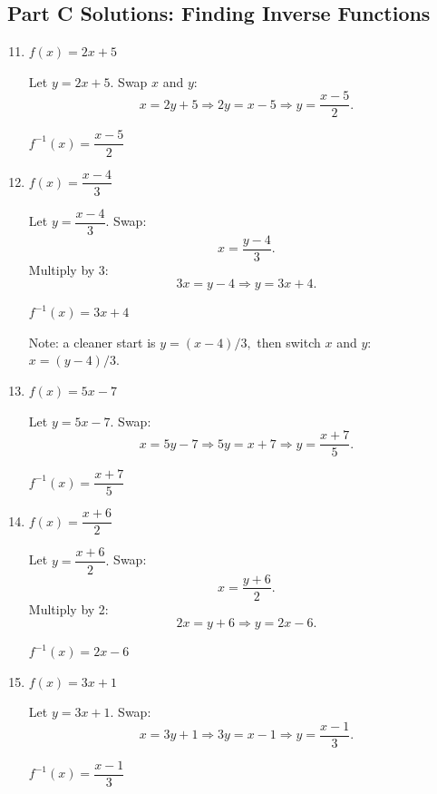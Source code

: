 \documentclass[14pt]{extarticle}
\begin{document}
\subsection*{Part C Solutions: Finding Inverse Functions}
\begin{enumerate}
  \setcounter{enumi}{10}
  \item \(f(x) = 2x + 5\)

  Let \(y = 2x + 5.\) Swap \(x\) and \(y\):
  \[
  x = 2y + 5 \Rightarrow 2y = x - 5 \Rightarrow y = \frac{x - 5}{2}.
  \]

  \(\boxed{f^{-1}(x) = \dfrac{x - 5}{2}}\)

  \item \(f(x) = \dfrac{x - 4}{3}\)

  Let \(y = \dfrac{x - 4}{3}.\) Swap:
  \[
  x = \dfrac{y - 4}{3}.
  \]
  Multiply by 3:
  \[
  3x = y - 4 \Rightarrow y = 3x + 4.
  \]

  \(\boxed{f^{-1}(x) = 3x + 4}\)

  Note: a cleaner start is \(y = (x - 4)/3,\) then switch \(x\) and \(y\): \(x = (y - 4)/3.\)

  \item \(f(x) = 5x - 7\)

  Let \(y = 5x - 7.\) Swap:
  \[
  x = 5y - 7 \Rightarrow 5y = x + 7 \Rightarrow y = \frac{x + 7}{5}.
  \]

  \(\boxed{f^{-1}(x) = \dfrac{x + 7}{5}}\)

  \item \(f(x) = \dfrac{x + 6}{2}\)

  Let \(y = \dfrac{x + 6}{2}.\) Swap:
  \[
  x = \dfrac{y + 6}{2}.
  \]
  Multiply by 2:
  \[
  2x = y + 6 \Rightarrow y = 2x - 6.
  \]

  \(\boxed{f^{-1}(x) = 2x - 6}\)

  \item \(f(x) = 3x + 1\)

  Let \(y = 3x + 1.\) Swap:
  \[
  x = 3y + 1 \Rightarrow 3y = x - 1 \Rightarrow y = \frac{x - 1}{3}.
  \]

  \(\boxed{f^{-1}(x) = \dfrac{x - 1}{3}}\)
\end{enumerate}
\end{document}
